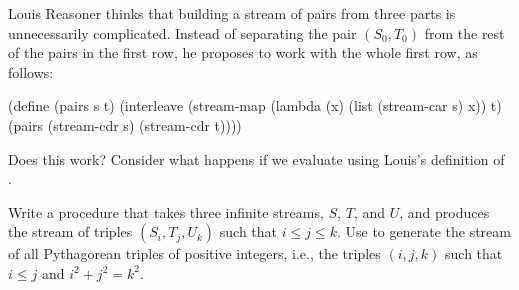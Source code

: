\begin{exercise}
	\label{Exercise 3.68}
	Louis Reasoner thinks that building a stream of pairs from three parts is unnecessarily complicated.
	Instead of separating the pair \( (S_0, T_0) \) from the rest of the pairs in the first row, he proposes to work with the whole first row, as follows:
	\begin{scheme}
	  (define (pairs s t)
	    (interleave
	     (stream-map (lambda (x) (list (stream-car s) x))
	                 t)
	     (pairs (stream-cdr s) (stream-cdr t))))
	\end{scheme}
	Does this work?
	Consider what happens if we evaluate  using Louis’s definition of .
\end{exercise}



\begin{exercise}
	\label{Exercise 3.69} Write a procedure  that takes three infinite streams, \( S \), \( T \), and \( U \), and produces the stream of triples \( (S_i, T_j, U_k) \) such that \( i ≤ j ≤ k \).
	Use  to generate the stream of all Pythagorean triples of positive integers, i.e., the triples \( (i, j, k) \) such that \( i ≤ j \) and \( i^2 + j^2 = k^2 \).
\end{exercise}



